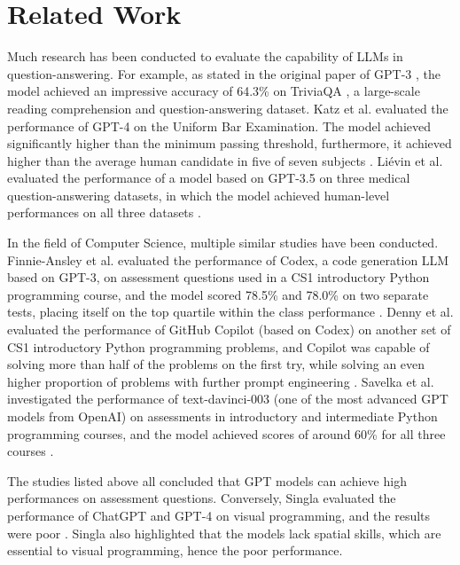 \documentclass[sigconf,authordraft]{acmart}
\begin{document}
\section{Related Work}
Much research has been conducted to evaluate the capability of LLMs in question-answering. For example, as stated in the original paper of GPT-3 \cite{gpt3}, the model achieved an impressive accuracy of 64.3\% on TriviaQA \cite{triviaqa}, a large-scale reading comprehension and question-answering dataset. Katz et al. evaluated the performance of GPT-4 on the Uniform Bar Examination. The model achieved significantly higher than the minimum passing threshold, furthermore, it achieved higher than the average human candidate in five of seven subjects \cite{testbar}. Liévin et al. evaluated the performance of a model based on GPT-3.5 on three medical question-answering datasets, in which the model achieved human-level performances on all three datasets \cite{testmed}.

In the field of Computer Science, multiple similar studies have been conducted. Finnie-Ansley et al. evaluated the performance of Codex, a code generation LLM based on GPT-3, on assessment questions used in a CS1 introductory Python programming course, and the model scored 78.5\% and 78.0\% on two separate tests, placing itself on the top quartile within the class performance \cite{testcodex}. Denny et al. evaluated the performance of GitHub Copilot (based on Codex) on another set of CS1 introductory Python programming problems, and Copilot was capable of solving more than half of the problems on the first try, while solving an even higher proportion of problems with further prompt engineering \cite{testcopilot}. Savelka et al. investigated the performance of text-davinci-003 (one of the most advanced GPT models from OpenAI) on assessments in introductory and intermediate Python programming courses, and the model achieved scores of around 60\% for all three courses \cite{testgpt}.

The studies listed above all concluded that GPT models can achieve high performances on assessment questions. Conversely, Singla evaluated the performance of ChatGPT and GPT-4 on visual programming, and the results were poor \cite{testvisual}. Singla also highlighted that the models lack spatial skills, which are essential to visual programming, hence the poor performance.
\end{document}
